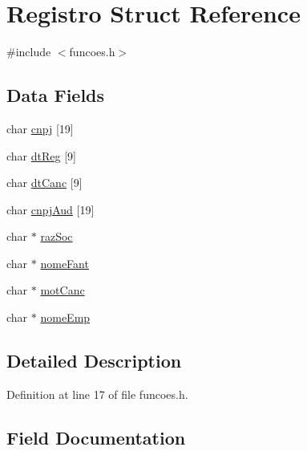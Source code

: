 \hypertarget{struct_registro}{}\section{Registro Struct Reference}
\label{struct_registro}


{\ttfamily \#include $<$funcoes.\+h$>$}

\subsection*{Data Fields}
\begin{DoxyCompactItemize}
\item 
char \hyperlink{struct_registro_a6082388e4578554e35bda724b4645b49}{cnpj} \mbox{[}19\mbox{]}
\item 
char \hyperlink{struct_registro_aea2f574e5e43077e6f9f79e8030c413c}{dt\+Reg} \mbox{[}9\mbox{]}
\item 
char \hyperlink{struct_registro_a4f39de4ffcb6e778b57e6cf9711c58fd}{dt\+Canc} \mbox{[}9\mbox{]}
\item 
char \hyperlink{struct_registro_ac767d84f592cf1f81fc71011438501d4}{cnpj\+Aud} \mbox{[}19\mbox{]}
\item 
char $\ast$ \hyperlink{struct_registro_a57902a9f5b5fe15477db3d3f2040b476}{raz\+Soc}
\item 
char $\ast$ \hyperlink{struct_registro_aa8e0b8aecdbb53a7c3611be836f6e326}{nome\+Fant}
\item 
char $\ast$ \hyperlink{struct_registro_a359053646ba364b1cf818bf4d771045e}{mot\+Canc}
\item 
char $\ast$ \hyperlink{struct_registro_a219e87312ae777d8cea8fe37cd665e08}{nome\+Emp}
\end{DoxyCompactItemize}


\subsection{Detailed Description}


Definition at line 17 of file funcoes.\+h.



\subsection{Field Documentation}
\mbox{\label{struct_registro_a6082388e4578554e35bda724b4645b49}} 
